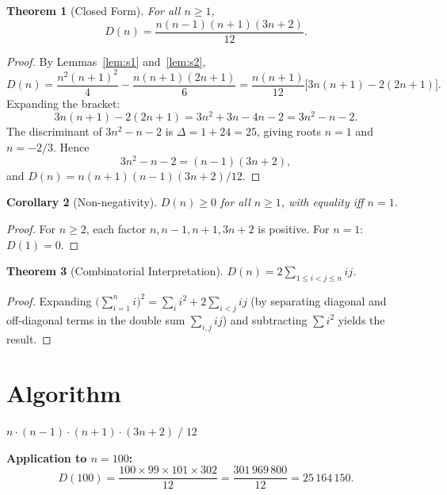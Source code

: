 \documentclass[11pt]{article}
\newtheorem{theorem}{Theorem}
\newtheorem{corollary}[theorem]{Corollary}
\begin{document}
\begin{theorem}[Closed Form]\label{thm:closed}
For all $n \ge 1$,
\[
D(n) = \frac{n(n-1)(n+1)(3n+2)}{12}.
\]
\end{theorem}

\begin{proof}
By Lemmas~\ref{lem:s1} and~\ref{lem:s2},
\[
D(n) = \frac{n^2(n+1)^2}{4} - \frac{n(n+1)(2n+1)}{6} = \frac{n(n+1)}{12}\bigl[3n(n+1) - 2(2n+1)\bigr].
\]
Expanding the bracket:
\[
3n(n+1) - 2(2n+1) = 3n^2 + 3n - 4n - 2 = 3n^2 - n - 2.
\]
The discriminant of $3n^2 - n - 2$ is $\Delta = 1 + 24 = 25$, giving roots $n = 1$ and $n = -2/3$. Hence
\[
3n^2 - n - 2 = (n - 1)(3n + 2),
\]
and $D(n) = n(n+1)(n-1)(3n+2)/12$.
\end{proof}

\begin{corollary}[Non-negativity]
$D(n) \ge 0$ for all $n \ge 1$, with equality iff $n = 1$.
\end{corollary}

\begin{proof}
For $n \ge 2$, each factor $n, n-1, n+1, 3n+2$ is positive. For $n = 1$: $D(1) = 0$.
\end{proof}

\begin{theorem}[Combinatorial Interpretation]\label{thm:comb}
$\displaystyle D(n) = 2\sum_{1 \le i < j \le n} ij$.
\end{theorem}

\begin{proof}
Expanding $\bigl(\sum_{i=1}^n i\bigr)^2 = \sum_i i^2 + 2\sum_{i<j} ij$ (by separating diagonal and off-diagonal terms in the double sum $\sum_{i,j} ij$) and subtracting $\sum i^2$ yields the result.
\end{proof}

\section{Algorithm}

\begin{algorithm}[H]
\caption{Sum square difference via closed form}
\begin{algorithmic}[1]
\RETURN $n \cdot (n-1) \cdot (n+1) \cdot (3n+2) \;/\; 12$
\end{algorithmic}
\end{algorithm}

\textbf{Application to $n = 100$:}
\[
D(100) = \frac{100 \times 99 \times 101 \times 302}{12} = \frac{301\,969\,800}{12} = 25\,164\,150.
\]
\end{document}
